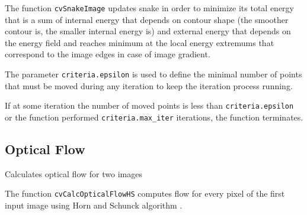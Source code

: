 The function \texttt{cvSnakeImage} updates snake in order to minimize its
total energy that is a sum of internal energy that depends on contour
shape (the smoother contour is, the smaller internal energy is) and
external energy that depends on the energy field and reaches minimum at
the local energy extremums that correspond to the image edges in case
of image gradient.

The parameter \texttt{criteria.epsilon} is used to define the minimal
number of points that must be moved during any iteration to keep the
iteration process running.

If at some iteration the number of moved points is less
than \texttt{criteria.epsilon} or the function performed
\texttt{criteria.max\_iter} iterations, the function terminates.

\subsection{Optical Flow}

\label{CalcOpticalFlowHS}

Calculates optical flow for two images


\begin{description}
\end{description}

The function \texttt{cvCalcOpticalFlowHS} computes flow for every pixel of the first input image using Horn and Schunck algorithm
\cite{Horn81}.

